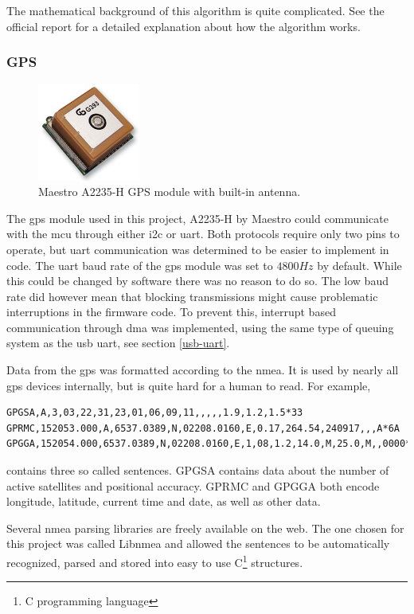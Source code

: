 The mathematical background of this algorithm is quite complicated. See the official report\cite{madgwick-report} for a detailed explanation about how the algorithm works.

\subsubsection{GPS}
\begin{figure}[H]
\centering
\includegraphics[width=0.3\textwidth]{Figures/A2235-H.jpg}
\caption{Maestro A2235-H GPS module with built-in antenna.}
\label{gps-figure}
\end{figure}
The \gls{gps} module used in this project, A2235-H by Maestro \cite{gps} could communicate with the \gls{mcu} through either \gls{i2c} or \gls{uart}. Both protocols require only two pins to operate, but \gls{uart} communication was determined to be easier to implement in code. The \gls{uart} baud rate of the \gls{gps} module was set to $4800Hz$ by default. While this could be changed by software there was no reason to do so. The low baud rate did however mean that blocking transmissions might cause problematic interruptions in the firmware code. To prevent this, interrupt based communication through \gls{dma} was implemented, using the same type of queuing system as the \gls{usb} \gls{uart}, see section \ref{usb-uart}.

Data from the \gls{gps} was formatted according to the \gls{nmea}. It is used by nearly all \gls{gps} devices internally, but is quite hard for a human to read. For example,
\begin{lstlisting}
GPGSA,A,3,03,22,31,23,01,06,09,11,,,,,1.9,1.2,1.5*33
GPRMC,152053.000,A,6537.0389,N,02208.0160,E,0.17,264.54,240917,,,A*6A
GPGGA,152054.000,6537.0389,N,02208.0160,E,1,08,1.2,14.0,M,25.0,M,,0000*68
\end{lstlisting}
contains three so called sentences. GPGSA contains data about the number of active satellites and positional accuracy. GPRMC and GPGGA both encode longitude, latitude, current time and date, as well as other data.

Several \gls{nmea} parsing libraries are freely available on the web. The one chosen for this project was called Libnmea\cite{libnmea} and allowed the sentences to be automatically recognized, parsed and stored into easy to use C\footnote{C programming language} structures.

